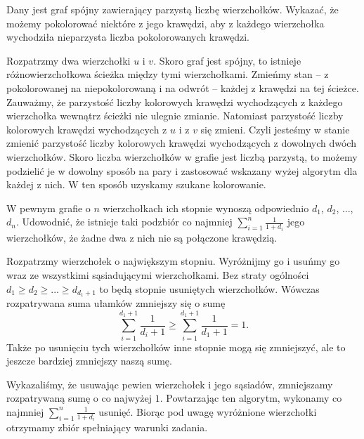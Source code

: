 \vspace{5px}

\newpage

\begin{problem}{4}
	Dany jest graf spójny zawierający parzystą liczbę wierzchołków. Wykazać, że możemy pokolorować niektóre z jego krawędzi, aby z każdego wierzchołka wychodziła nieparzysta liczba pokolorowanych krawędzi.
\end{problem}

\noindent
Rozpatrzmy dwa wierzchołki $u$ i $v$. Skoro graf jest spójny, to istnieje różnowierzchołkowa ścieżka między tymi wierzchołkami. Zmieńmy stan -- z pokolorowanej na niepokolorowaną i na odwrót --  każdej z krawędzi na tej ścieżce. Zauważmy, że parzystość liczby kolorowych krawędzi wychodzących z każdego wierzchołka wewnątrz ścieżki nie ulegnie zmianie. Natomiast parzystość liczby kolorowych krawędzi wychodzących z $u$ i z $v$ się zmieni. Czyli jesteśmy w stanie zmienić parzystość liczby kolorowych krawędzi wychodzących z dowolnych dwóch wierzchołków. Skoro liczba wierzchołków w grafie jest liczbą parzystą, to możemy podzielić je w dowolny sposób na pary i zastosować wskazany wyżej algorytm dla każdej z nich. W ten sposób uzyskamy szukane kolorowanie.

\vspace{5px}

\begin{problem}{5}
	W pewnym grafie o $n$ wierzchołkach ich stopnie wynoszą odpowiednio $d_1$, $d_2$, ..., $d_n$. Udowodnić, że istnieje taki podzbiór co najmniej $\sum^{n}_{i = 1} \frac{1}{1 + d_i}$ jego wierzchołków, że żadne dwa z nich nie są połączone krawędzią.
\end{problem}

\noindent
Rozpatrzmy wierzchołek o największym stopniu. Wyróżnijmy go i usuńmy go wraz ze wszystkimi sąsiadującymi wierzchołkami. Bez straty ogólności $d_1 \geqslant d_2 \geqslant ... \geqslant d_{d_1 + 1}$ to będą stopnie usuniętych wierzchołków. Wówczas rozpatrywana suma ułamków zmniejszy się o sumę
\[
	\sum^{d_1 + 1}_{i = 1} \frac{1}{d_i + 1} \geqslant \sum^{d_1 + 1}_{i = 1} \frac{1}{d_1 + 1} = 1.
\]
Także po usunięciu tych wierzchołków inne stopnie mogą się zmniejszyć, ale to jeszcze bardziej zmniejszy naszą sumę.

\vspace{10px}
\noindent
Wykazaliśmy, że usuwając pewien wierzchołek i jego sąsiadów, zmniejszamy rozpatrywaną sumę o co najwyżej $1$. Powtarzając ten algorytm, wykonamy co najmniej $\sum^{n}_{i = 1} \frac{1}{1 + d_i}$ usunięć. Biorąc pod uwagę wyróżnione wierzchołki otrzymamy zbiór spełniający warunki zadania.

